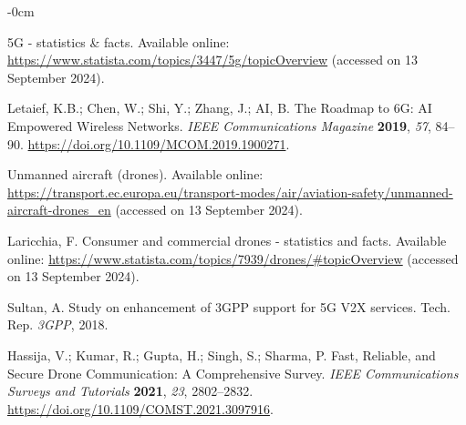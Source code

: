 \documentclass[futureinternet,article,submit,pdftex,moreauthors]{Definitions/mdpi}
\begin{document}
\begin{adjustwidth}{-\extralength}{0cm}



%

\begin{thebibliography}{999}

5G - statistics \& facts. Available online: \url{https://www.statista.com/topics/3447/5g/topicOverview} (accessed on 13 September 2024).

Letaief, K.B.; Chen, W.; Shi, Y.; Zhang, J.; AI, B. The Roadmap to 6G: AI Empowered Wireless Networks. {\em IEEE Communications Magazine} {\bf 2019}, {\em 57}, 84--90. \url{https://doi.org/10.1109/MCOM.2019.1900271}.

Unmanned aircraft (drones). Available online: \url{https://transport.ec.europa.eu/transport-modes/air/aviation-safety/unmanned-aircraft-drones_en} (accessed on 13 September 2024).

Laricchia, F. Consumer and commercial drones - statistics and facts. Available online: \url{https://www.statista.com/topics/7939/drones/\#topicOverview} (accessed on 13 September 2024).

Sultan, A. Study on enhancement of 3GPP support for 5G V2X services. Tech. Rep. {\em 3GPP}, 2018.

Hassija, V.; Kumar, R.; Gupta, H.; Singh, S.; Sharma, P. Fast, Reliable, and Secure Drone Communication: A Comprehensive Survey. {\em IEEE Communications Surveys and Tutorials} {\bf 2021}, {\em 23}, 2802--2832. \url{https://doi.org/10.1109/COMST.2021.3097916}.


\end{thebibliography}
\end{adjustwidth}
\end{document}
